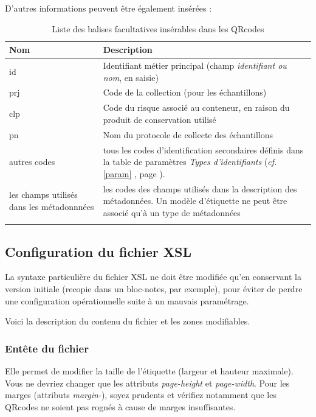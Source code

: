 D'autres informations peuvent être également insérées :
\begin{longtable}{|p{3cm}|p{12cm}| }
\hline
\textbf{Nom} & \textbf{Description} \\
\hline
\endhead
id & Identifiant métier principal (champ \textit{identifiant ou nom}, en saisie) \\
\hline
prj & Code de la collection (pour les échantillons) \\
\hline
clp & Code du risque associé au conteneur, en raison du produit de conservation utilisé \\
\hline
pn & Nom du protocole de collecte des échantillons \\
\hline
autres codes & tous les codes d'identification secondaires définis dans la table de paramètres \textit{Types d'identifiants} (\textit{cf.} \ref{param} \textit{\nameref{param}}, page \pageref{param}). \\
\hline
les champs utilisés dans les métadonnnées & les codes des champs utilisés dans la description des métadonnées. Un modèle d'étiquette ne peut être associé qu'à un type de métadonnées \\
\hline

\caption{Liste des balises facultatives insérables dans les QRcodes}
\end{longtable}

\subsection{Configuration du fichier XSL}

La syntaxe particulière du fichier XSL ne doit être modifiée qu'en conservant la version initiale (recopie dans un bloc-notes, par exemple), pour éviter de perdre une configuration opérationnelle suite à un mauvais paramétrage.

Voici la description du contenu du fichier et les zones modifiables.

\subsubsection{Entête du fichier}
Elle permet de modifier la taille de l'étiquette (largeur et hauteur maximale). Vous ne devriez changer que les attributs \textit{page-height} et \textit{page-width}. Pour les marges (attributs \textit{margin-}), soyez prudents et vérifiez notamment que les QRcodes ne soient pas rognés à cause de marges insuffisantes.

